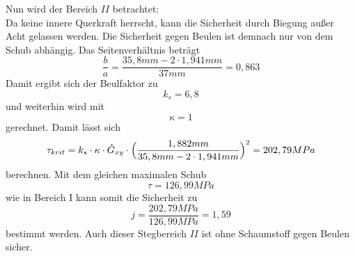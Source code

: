 \noindent Nun wird der Bereich $II$ betrachtet:\\
Da keine innere Querkraft herrscht, kann die Sicherheit durch Biegung außer Acht gelassen werden. Die Sicherheit gegen Beulen ist demnach nur von dem Schub abhängig.
Das Seitenverhältnis beträgt 
\begin{equation}
	\frac{b}{a}=\frac{35,8mm - 2\cdot 1,941mm}{37mm}=0,863
\end{equation}
Damit ergibt sich der Beulfaktor zu 
\begin{equation}
	k_{s}=6,8
\end{equation}
und weiterhin wird mit 
\begin{equation}
	\kappa = 1 
\end{equation}
gerechnet. Damit lässt sich 
\begin{equation}
	 \tau_{krit} = k_{s}\cdot \kappa\cdot \hat{G}_{xy}\cdot \Bigl(\frac{1,882mm}{35,8mm-2\cdot 1,941mm}\Bigr)^{2}= 202,79 MPa
\end{equation}
berechnen. Mit dem gleichen maximalen Schub
\begin{equation}
	\tau=126,99 MPa
\end{equation}
 wie in Bereich I kann somit die Sicherheit zu 
 \begin{equation}
 	j=\frac{202,79MPa}{126,99MPa}=1,59
 \end{equation}
bestimmt werden. Auch dieser Stegbereich $II$ ist ohne Schaumstoff gegen Beulen sicher.\\

